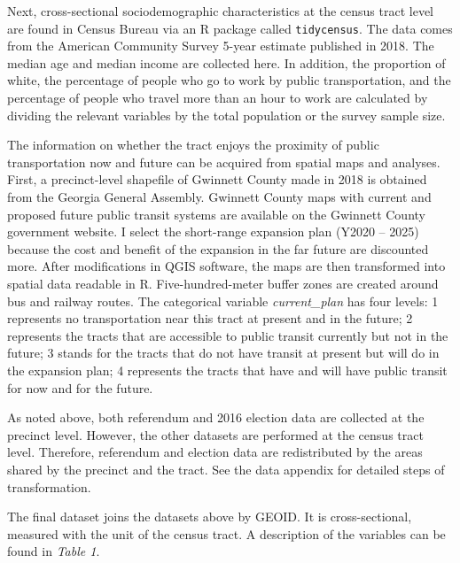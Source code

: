 \documentclass[
]{article}
\begin{document}
Next, cross-sectional sociodemographic characteristics at the census
tract level are found in Census Bureau via an R package called
\texttt{tidycensus}. The data comes from the American Community Survey
5-year estimate published in 2018. The median age and median income are
collected here. In addition, the proportion of white, the percentage of
people who go to work by public transportation, and the percentage of
people who travel more than an hour to work are calculated by dividing
the relevant variables by the total population or the survey sample
size.

The information on whether the tract enjoys the proximity of public
transportation now and future can be acquired from spatial maps and
analyses. First, a precinct-level shapefile of Gwinnett County made in
2018 is obtained from the Georgia General Assembly. Gwinnett County maps
with current and proposed future public transit systems are available on
the Gwinnett County government website. I select the short-range
expansion plan (Y2020 -- 2025) because the cost and benefit of the
expansion in the far future are discounted more. After modifications in
QGIS software, the maps are then transformed into spatial data readable
in R. Five-hundred-meter buffer zones are created around bus and railway
routes. The categorical variable \emph{current\_plan} has four levels: 1
represents no transportation near this tract at present and in the
future; 2 represents the tracts that are accessible to public transit
currently but not in the future; 3 stands for the tracts that do not
have transit at present but will do in the expansion plan; 4 represents
the tracts that have and will have public transit for now and for the
future.

As noted above, both referendum and 2016 election data are collected at
the precinct level. However, the other datasets are performed at the
census tract level. Therefore, referendum and election data are
redistributed by the areas shared by the precinct and the tract. See the
data appendix for detailed steps of transformation.

The final dataset joins the datasets above by GEOID. It is
cross-sectional, measured with the unit of the census tract. A
description of the variables can be found in \emph{Table 1}.
\end{document}
